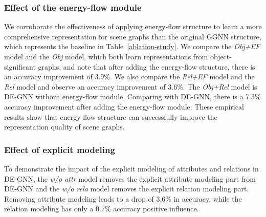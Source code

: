 \documentclass[letterpaper]{article} %
\begin{document}
\subsubsection{Effect of the energy-flow module} We corroborate the effectiveness of applying energy-flow structure to learn a more comprehensive representation for scene graphs than the original GGNN structure, which represents the baseline in Table~\ref{ablation-study}. 
We compare the \emph{Obj+EF} model and the \emph{Obj} model, which both learn representations from object-significant graphs, and note that after adding the energy-flow structure, there is an accuracy improvement of 3.9\%. 
We also compare the \emph{Rel+EF} model and the \emph{Rel} model and observe an accuracy improvement of 3.6\%. 
The \emph{Obj+Rel} model is DE-GNN without energy-flow module. 
Comparing with DE-GNN, there is a 7.3\% accuracy improvement after adding the energy-flow module. 
These empirical results show that energy-flow structure can successfully improve the representation quality of scene graphs. 

\subsubsection{Effect of explicit modeling} To demonstrate the impact of the explicit modeling of attributes and relations in DE-GNN, the \emph{w/o attr} model removes the explicit attribute modeling part from DE-GNN and the \emph{w/o rela} model removes the explicit relation modeling part. 
Removing attribute modeling leads to a drop of 3.6\% in accuracy, while the relation modeling has only a 0.7\% accuracy positive influence.


\end{document}
